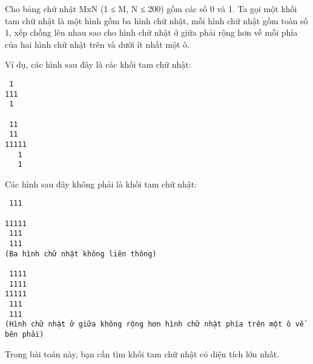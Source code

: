 Cho bảng chữ nhật MxN (1 ≤ M, N ≤ 200) gồm các số 0 và 1. Ta gọi một       khối tam chữ nhật      là một hình gồm ba hình chữ nhật, mỗi hình chữ nhật gồm toàn số 1, xếp chồng lên nhau sao cho hình chữ nhật ở giữa phải rộng hơn về mỗi phía của hai hình chữ nhật trên và dưới ít nhất một ô.  

   Ví dụ, các hình sau đây là các khối tam chữ nhật:  
\begin{verbatim}
 1	
111
 1	
 
 11		
 11		
11111
   1		
   1		
\end{verbatim}

   Các hình sau đây không phải là khối tam chữ nhật:  
\begin{verbatim}
 111
	 				
11111
 111	
 111	
(Ba hình chữ nhật không liên thông)

 1111
 1111
11111
 111	
 111	
(Hình chữ nhật ở giữa không rộng hơn hình chữ nhật phía trên một ô về bên phải)
\end{verbatim}

   Trong bài toán này, bạn cần tìm khối tam chữ nhật có diện tích lớn nhất.  

\